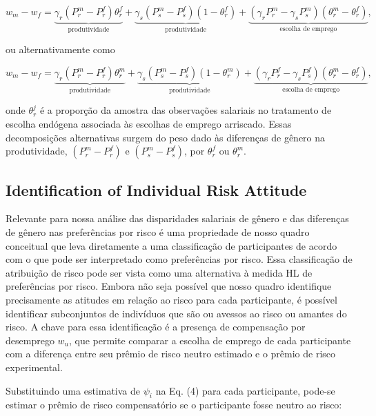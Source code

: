 \documentclass[a4paper,12pt]{article}[abntex2]
\begin{document}
\begin{equation}
w_m - w_f = \underbrace{\gamma_r \left(P_r^m - P_r^f\right)\theta_r^f}_{\text{produtividade}} + \underbrace{\gamma_s \left(P_s^m - P_s^f\right)\left(1 - \theta_r^f\right)}_{\text{produtividade}}
+ \underbrace{\left(\gamma_r P_r^m - \gamma_s P_s^m\right)\left(\theta_r^m - \theta_r^f\right)}_{\text{escolha de emprego}},
\end{equation}

ou alternativamente como

\begin{equation}
w_m - w_f = \underbrace{\gamma_r \left(P_r^m - P_r^f\right)\theta_r^m}_{\text{produtividade}} + \underbrace{\gamma_s \left(P_s^m - P_s^f\right)\left(1 - \theta_r^m\right)}_{\text{produtividade}}
+ \underbrace{\left(\gamma_r P_r^f - \gamma_s P_s^f\right)\left(\theta_r^m - \theta_r^f\right)}_{\text{escolha de emprego}},
\end{equation}

onde \( \theta_r^j \) é a proporção da amostra das observações salariais no tratamento de escolha endógena associada às escolhas de emprego arriscado. Essas decomposições alternativas surgem do peso dado às diferenças de gênero na produtividade, \( \left(P_r^m - P_r^f\right) \) e \( \left(P_s^m - P_s^f\right) \), por \( \theta_r^f \) ou \( \theta_r^m \).

\subsection{\textbf{Identiﬁcation of Individual Risk Attitude}}

Relevante para nossa análise das disparidades salariais de gênero e das diferenças de gênero nas preferências por risco é uma propriedade de nosso quadro conceitual que leva diretamente a uma classificação de participantes de acordo com o que pode ser interpretado como preferências por risco. Essa classificação de atribuição de risco pode ser vista como uma alternativa à medida HL de preferências por risco. Embora não seja possível que nosso quadro identifique precisamente as atitudes em relação ao risco para cada participante, é possível identificar subconjuntos de indivíduos que são ou avessos ao risco ou amantes do risco. A chave para essa identificação é a presença de compensação por desemprego \( w_u \), que permite comparar a escolha de emprego de cada participante com a diferença entre seu prêmio de risco neutro estimado e o prêmio de risco experimental.

Substituindo uma estimativa de \( \psi_i \) na Eq. (4) para cada participante, pode-se estimar o prêmio de risco compensatório se o participante fosse neutro ao risco:
\end{document}
